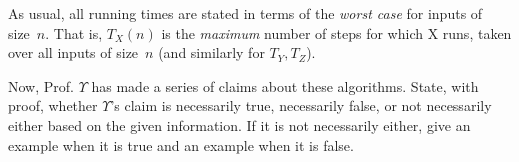 \documentclass[11pt,addpoints]{exam}
\begin{document}
\begin{questions}
  As usual, all running times are stated in terms of the \emph{worst case} for inputs of size~$n$.
  That is, $T_{X}(n)$ is the \emph{maximum} number of steps for which X runs, taken over all inputs of size~$n$ (and similarly for $T_{Y}, T_{Z}$).

  Now, Prof. $\Upsilon$ has made a series of claims about these algorithms.  State, with proof, whether $\Upsilon$'s claim is necessarily true, necessarily false, or not necessarily either based on the given information. If it is not necessarily either, give an example when it is true and an example when it is false. 



\end{questions}
\end{document}
